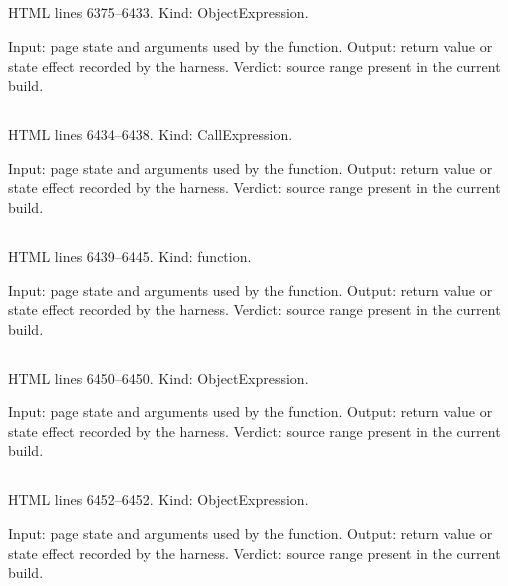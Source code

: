 \subsection*{\texttt{}}
\label{vf_297_CC_LIMIT_TEXT}
HTML lines 6375--6433. Kind: ObjectExpression.

Input: page state and arguments used by the function.
Output: return value or state effect recorded by the harness.
Verdict: source range present in the current build.

\subsection*{\texttt{}}
\label{vf_298_CONSOLE_DICT}
HTML lines 6434--6438. Kind: CallExpression.

Input: page state and arguments used by the function.
Output: return value or state effect recorded by the harness.
Verdict: source range present in the current build.

\subsection*{\texttt{}}
\label{vf_299_ccAlarmDir}
HTML lines 6439--6445. Kind: function.

Input: page state and arguments used by the function.
Output: return value or state effect recorded by the harness.
Verdict: source range present in the current build.

\subsection*{\texttt{}}
\label{vf_300_CC_STATE}
HTML lines 6450--6450. Kind: ObjectExpression.

Input: page state and arguments used by the function.
Output: return value or state effect recorded by the harness.
Verdict: source range present in the current build.

\subsection*{\texttt{}}
\label{vf_301_CC_COL}
HTML lines 6452--6452. Kind: ObjectExpression.

Input: page state and arguments used by the function.
Output: return value or state effect recorded by the harness.
Verdict: source range present in the current build.

